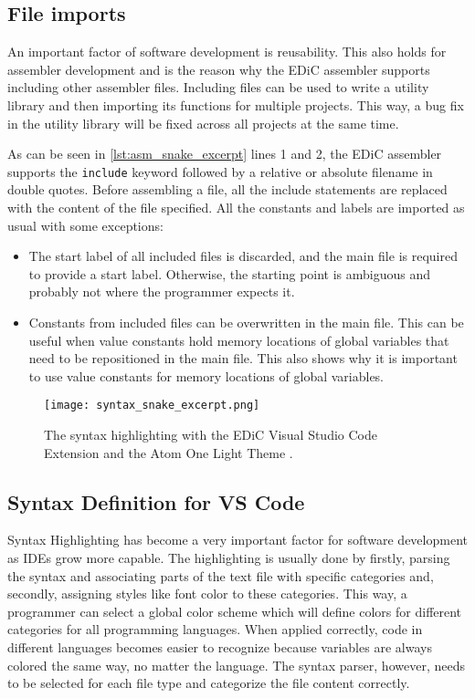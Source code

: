 \subsection{File imports}\label{sec:imports}
An important factor of software development is reusability.
This also holds for assembler development and is the reason why the \gls{EDiC} assembler supports including other assembler files.
Including files can be used to write a utility library and then importing its functions for multiple projects.
This way, a bug fix in the utility library will be fixed across all projects at the same time.

As can be seen in \cref{lst:asm_snake_excerpt} lines 1 and 2, the \gls{EDiC} assembler supports the \texttt{include} keyword followed by a relative or absolute filename in double quotes.
Before assembling a file, all the include statements are replaced with the content of the file specified.
All the constants and labels are imported as usual with some exceptions:
\begin{itemize}
  \item The start label of all included files is discarded, and the main file is required to provide a start label.
        Otherwise, the starting point is ambiguous and probably not where the programmer expects it.
  \item Constants from included files can be overwritten in the main file.
        This can be useful when value constants hold memory locations of global variables that need to be repositioned in the main file.
        This also shows why it is important to use value constants for memory locations of global variables.
\end{itemize}


\begin{figure}[t]
  \centering
  \texttt{[image: syntax\_snake\_excerpt.png]}
  \caption{The syntax highlighting with the \gls{EDiC} Visual Studio Code Extension and the Atom One Light Theme \cite{VSCodeLight}.}
  \label{fig:SyntaxEDiC}
\end{figure}
\subsection{Syntax Definition for VS Code}
Syntax Highlighting has become a very important factor for software development as \glspl{IDE} grow more capable.
The highlighting is usually done by firstly, parsing the syntax and associating parts of the text file with specific categories and, secondly, assigning styles like font color to these categories.
This way, a programmer can select a global color scheme which will define colors for different categories for all programming languages.
When applied correctly, code in different languages becomes easier to recognize because variables are always colored the same way, no matter the language.
The syntax parser, however, needs to be selected for each file type and categorize the file content correctly.

